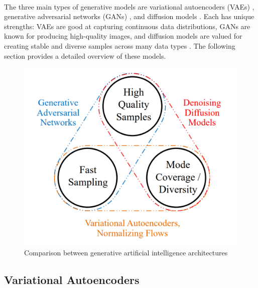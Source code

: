 \\
The three main types of generative models are variational autoencoders (VAEs) \cite{kingma_auto-encoding_2013}, generative adversarial networks (GANs) \cite{goodfellow_generative_2014}, and diffusion models \cite{sohl-dickstein_deep_2015}. Each has unique strengths: VAEs are good at capturing continuous data distributions, GANs are known for producing high-quality images, and diffusion models are valued for creating stable and diverse samples across many data types \cite{xiao_tackling_2022}. The following section provides a detailed overview of these models.

\begin{figure} [h]
    \centering
    \includegraphics[width=0.35 \linewidth]{Figures/1-intro/GenAI_comparison.png}
    \caption{Comparison between generative artificial intelligence architectures \cite{xiao_tackling_2022}}
    \label{fig:GenAI_comparison}
\end{figure}

\subsection{Variational Autoencoders}

